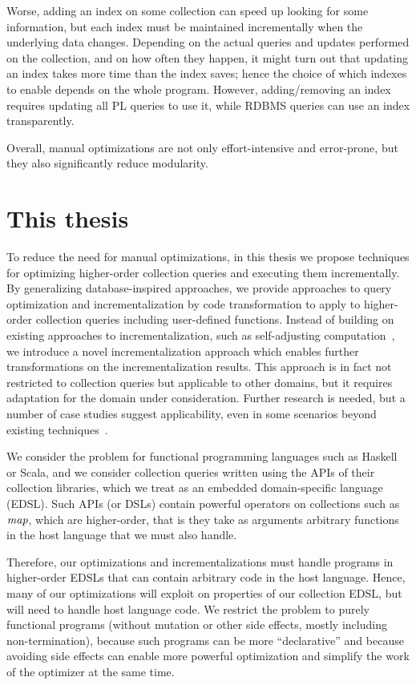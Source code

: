 Worse, adding an index on some collection can speed up looking
for some information, but each index must be maintained incrementally when the
underlying data changes. Depending on the actual queries and updates performed
on the collection, and on how often they happen, it might turn out that updating
an index takes more time than the index saves; hence the choice of which indexes
to enable depends on the whole program. However, adding/removing an index
requires updating all PL queries to use it, while RDBMS queries can use an index
transparently.

Overall, manual optimizations are not only effort-intensive and error-prone, but
they also significantly reduce modularity.

\section{This thesis}
To reduce the need for manual optimizations, in this thesis we propose
techniques for optimizing higher-order collection queries and executing them
incrementally.
By generalizing database-inspired approaches, we provide approaches to query optimization and
incrementalization by code transformation to apply to higher-order collection
queries including user-defined functions.
Instead of building on existing approaches to incrementalization, such as
self-adjusting computation~\citep{Acar09}, we introduce a novel
incrementalization approach which enables further transformations on the
incrementalization results. This approach is in fact not restricted to
collection queries but applicable to other domains, but it requires adaptation
for the domain under consideration.
%
Further research is needed, but a number of case studies suggest
applicability, even in some scenarios beyond existing
techniques~\citep{Koch2016incremental}.

We consider the problem for functional programming languages such as Haskell or
Scala, and we consider collection queries written using the APIs of their
collection libraries, which we treat as an embedded domain-specific language
(EDSL). Such APIs (or DSLs) contain powerful operators on collections such as
$\mathit{map}$,
which are higher-order, that
is they take as arguments arbitrary functions in the host language that we must
also handle.

Therefore, our optimizations and incrementalizations must handle programs in
higher-order EDSLs that can contain arbitrary code in the host language. Hence,
many of our optimizations will exploit on properties of our collection EDSL, but
will need to handle host language code. We restrict the problem to purely
functional programs (without mutation or other side effects, mostly including
non-termination), because such programs can be more ``declarative'' and because
avoiding side effects can enable more powerful optimization and simplify the
work of the optimizer at the same time.

